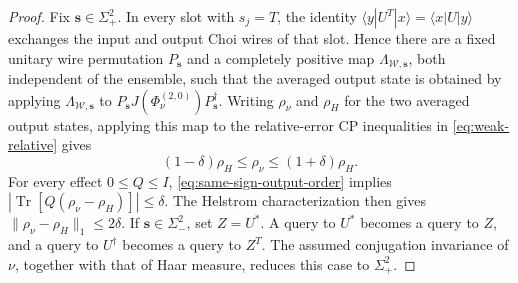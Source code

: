 \documentclass[
    aps,
    superscriptaddress,
    onecolumn,
    10pt,
    prx,
    nofootinbib
]{revtex4-2}
\theoremstyle{namedstatement}
\theoremstyle{plain}
\begin{document}
\begin{proof}
Fix $\boldsymbol{s}\in\Sigma_+^2$. In every slot with $s_j=T$, the identity $\langle y|U^T|x\rangle=\langle x|U|y\rangle$ exchanges the input and output Choi wires of that slot. Hence there are a fixed unitary wire permutation $P_{\boldsymbol{s}}$ and a completely positive map $\Lambda_{\mathcal W,\boldsymbol{s}}$, both independent of the ensemble, such that the averaged output state is obtained by applying $\Lambda_{\mathcal W,\boldsymbol{s}}$ to $P_{\boldsymbol{s}}J(\Phi_\nu^{(2,0)})P_{\boldsymbol{s}}^\dagger$. Writing $\rho_\nu$ and $\rho_H$ for the two averaged output states, applying this map to the relative-error CP inequalities in \cref{eq:weak-relative} gives
\begin{equation}
(1-\delta)\rho_H
\le
\rho_\nu
\le
(1+\delta)\rho_H.
\label{eq:same-sign-output-order}
\end{equation}
For every effect $0\le Q\le I$, \cref{eq:same-sign-output-order} implies $|\operatorname{Tr}[Q(\rho_\nu-\rho_H)]|\le\delta$. The Helstrom characterization then gives $\|\rho_\nu-\rho_H\|_1\le2\delta$. If $\boldsymbol{s}\in\Sigma_-^2$, set $Z=U^*$. A query to $U^*$ becomes a query to $Z$, and a query to $U^\dagger$ becomes a query to $Z^T$. The assumed conjugation invariance of $\nu$, together with that of Haar measure, reduces this case to $\Sigma_+^2$.
\end{proof}
\fi
\end{document}
